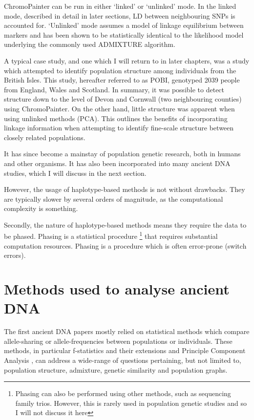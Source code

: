 {ChromoPainter can be run in either `linked' or `unlinked' mode. In the linked mode, described in detail in later sections, LD between neighbouring SNPs is accounted for. `Unlinked' mode assumes a model of linkage equilibrium between markers and has been shown to be statistically identical to the likelihood model underlying the commonly used ADMIXTURE algorithm. 

A typical case study, and one which I will return to in later chapters, was a study which attempted to identify population structure among individuals from the British Isles. This study, hereafter referred to as POBI, genotyped 2039 people from England, Wales and Scotland. In summary, it was possible to detect structure down to the level of Devon and Cornwall (two neighbouring counties) using ChromoPainter. On the other hand, little structure was apparent when using unlinked methods (PCA). This outlines the benefits of incorporating linkage information when attempting to identify fine-scale structure between closely related populations.


It has since become a mainstay of population genetic research, both in humans and other organisms. It has also been incorporated into many ancient DNA studies, which I will discuss in the next section. 

However, the usage of haplotype-based methods is not without drawbacks. They are typically slower by several orders of magnitude, as the computational complexity is something. 

Secondly, the nature of haplotype-based methods means they require the data to be phased. Phasing is a statistical procedure \footnote{Phasing can also be performed using other methods, such as sequencing family trios. However, this is rarely used in population genetic studies and so I will not discuss it here} that requires substantial computation resources. Phasing is a procedure which is often error-prone (switch errors).


\section{Methods used to analyse ancient DNA}

The first ancient DNA papers mostly relied on statistical methods which compare allele-sharing or allele-frequencies between populations or individuals. These methods, in particular f-statistics and their extensions \cite{Green2010, Patterson2012, peter2016admixture} and Principle Component Analysis \cite{price2006principal}, can address a wide-range of questions pertaining, but not limited to, population structure, admixture, genetic similarity and population graphs. 

}
